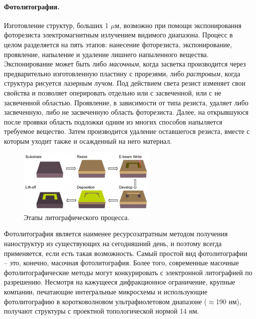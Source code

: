 \documentclass[12pt, twoside]{report}
\numberwithin{equation}{section}
\numberwithin{figure}{section}
\begin{document}
\paragraph{Фотолитография.} Изготовление структур, больших 1 $\mu$м, возможно при помощи экспонирования фоторезиста электромагнитным излучением видимого диапазона. Процесс в целом разделяется на пять этапов: нанесение фоторезиста, экспонирование, проявление, напыление и удаление лишнего напыленного вещества. Экспонирование может быть либо \textit{масочным}, когда засветка производится через предварительно изготовленную пластину с прорезями, либо \textit{растровым}, когда структура рисуется лазерным лучом. Под действием света резист изменяет свои свойства и позволяет оперировать отдельно или с засвеченной, или с не засвеченной областью. Проявление, в зависимости от типа резиста, удаляет либо засвеченную, либо не засвеченную область фоторезиста. Далее, на открывшуюся после проявки область подложки одним из многих способов напыляется требуемое вещество.
Затем производится удаление оставшегося резиста, вместе с которым уходит также и осажденный на него материал.

\begin{figure}[h]
\centering
\includegraphics[width=0.6\textwidth]{Pictures/lithography}
\caption{Этапы литографического процесса.}
\label{fig:lithography}
\end{figure}

Фотолитография является наименее ресурсозатратным методом получения наноструктур из существующих на сегодняшний день, и поэтому всегда применяется, если есть такая возможность. Самый простой вид фотолитографии -- это, конечно, масочная фотолитография. Более того, современные масочные фотолитографические методы могут конкурировать с электронной литографией по разрешению. Несмотря на кажущееся дифракционное ограничение, крупные компании, печатающие интегральные микросхемы и использующие фотолитографию в коротковолновом ультрафиолетовом диапазоне ($\approx$190 нм), получают структуры с проектной топологической нормой 14 нм. 
\end{document}
